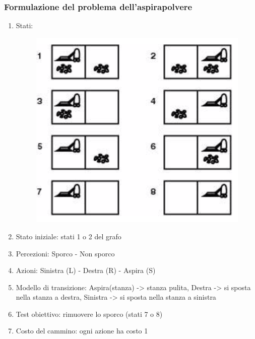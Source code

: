 \documentclass{article}
\begin{document}
\subsubsection{Formulazione del problema dell'aspirapolvere}
\begin{enumerate}
    \item Stati: 
        \begin{figure}[H]
            \centering
            \includegraphics[scale=0.2]{Images/statiaspirapolvere.png}
        \end{figure}
    \item Stato iniziale: stati 1 o 2 del grafo 
    \item Percezioni: Sporco - Non sporco
    \item Azioni: Sinistra (L) - Destra (R) - Aspira (S)
    \item Modello di transizione: Aspira(stanza) -> stanza pulita, Destra -> si sposta nella stanza a destra, Sinistra -> si sposta nella stanza a sinistra
    \item Test obiettivo: rimuovere lo sporco (stati 7 o 8)
    \item Costo del cammino: ogni azione ha costo 1
\end{enumerate}
\end{document}
